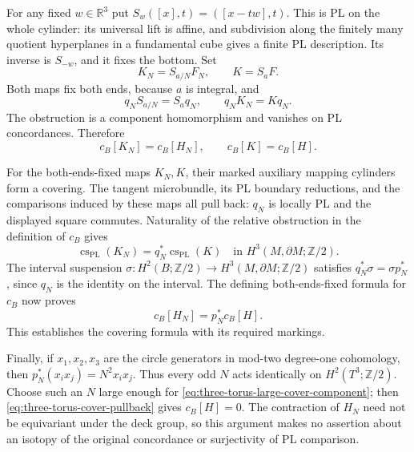For any fixed $w\in\mathbb R^3$ put
$S_w([x],t)=([x-tw],t)$.  This is PL on the whole cylinder:
its universal lift is affine, and subdivision along the finitely
many quotient hyperplanes in a fundamental cube gives a finite
PL description.  Its inverse is $S_{-w}$, and it fixes the bottom.
Set
\[
 K_N=S_{a/N}F_N,\qquad K=S_aF.
\]
Both maps fix both ends, because $a$ is integral, and
\[
 q_NS_{a/N}=S_aq_N,\qquad q_NK_N=Kq_N.
\]
The obstruction is a component homomorphism and vanishes on PL
concordances.  Therefore
\[
 c_B[K_N]=c_B[H_N],\qquad c_B[K]=c_B[H].
\]

For the both-ends-fixed maps $K_N,K$, their marked auxiliary
mapping cylinders form a covering.  The tangent microbundle,
its PL boundary reductions, and the comparisons induced by these
maps all pull back: $q_N$ is locally PL and the displayed square
commutes.  Naturality of the relative obstruction in the definition
of $c_B$ gives
\[
 \operatorname{cs}_{\mathrm{PL}}(K_N)
       =q_N^*\operatorname{cs}_{\mathrm{PL}}(K)
       \quad\text{in }H^3(M,\partial M;\mathbb Z/2).
\]
The interval suspension $\sigma:H^2(B;\mathbb Z/2)\to
H^3(M,\partial M;\mathbb Z/2)$ satisfies
$q_N^*\sigma=\sigma p_N^*$, since $q_N$ is the identity
on the interval.  The defining both-ends-fixed formula for $c_B$
now proves
\begin{equation}\label{eq:three-torus-cover-pullback}
 c_B[H_N]=p_N^*c_B[H].
\end{equation}
This establishes the covering formula with its required markings.

Finally, if $x_1,x_2,x_3$ are the circle generators in mod-two
degree-one cohomology, then $p_N^*(x_ix_j)=N^2x_ix_j$.
Thus every odd $N$ acts identically on $H^2(T^3;\mathbb Z/2)$.
Choose such an $N$ large enough for
\eqref{eq:three-torus-large-cover-component}; then
\eqref{eq:three-torus-cover-pullback} gives $c_B[H]=0$.
The contraction of $H_N$ need not be equivariant under the deck
group, so this argument makes no assertion about an isotopy of
the original concordance or surjectivity of PL comparison.
